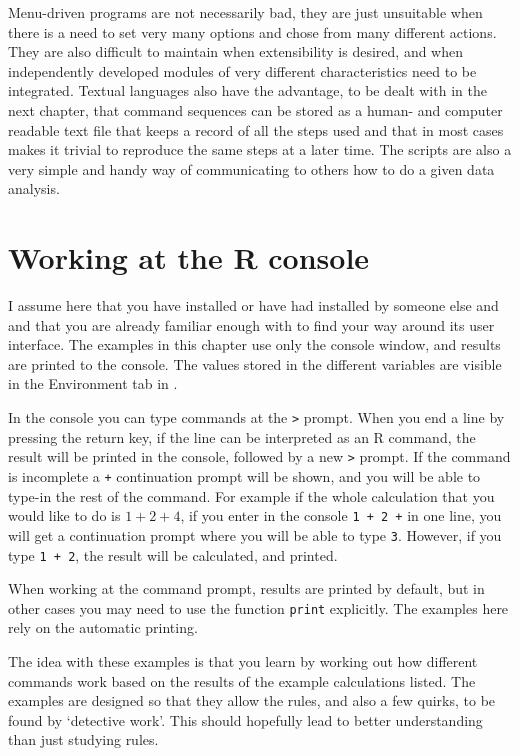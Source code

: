 \documentclass[paper=a4,headsepline,BCOR=12mm,twoside,open=right,%
titlepage,headings=small,fontsize=10pt,index=totoc,bibliography=totoc,%
captions=tableheading,captions=nooneline]{scrbook}\usepackage{knitr}
\begin{document}
Menu-driven programs are not necessarily bad, they are just unsuitable when there is a need to set very many options and chose from many different actions. They are also difficult to maintain when extensibility is desired, and when independently developed modules of very different characteristics need to be integrated. Textual languages also have the advantage, to be dealt with in the next chapter, that command sequences can be stored as a human- and computer readable text file that keeps a record of all the steps used and that in most cases makes it trivial to reproduce the same steps at a later time. The scripts are also a very simple and handy way of communicating to others how to do a given data analysis.

\section{Working at the R console}

I assume here that you have installed or have had installed by someone else \R and \RStudio and that you are already familiar enough with \RStudio to find your way around its user interface. The examples in this chapter use only the console window, and results are printed to the console. The values stored in the different variables are visible in the Environment tab in \RStudio.

In the console you can type commands at the \texttt{>} prompt.
When you end a line by pressing the return key, if the line can be interpreted as an R command, the result will be printed in the console, followed by a new \texttt{>} prompt.
If the command is incomplete a \texttt{+} continuation prompt will be shown, and you will be able to type-in the rest of the command. For example if the whole calculation that you would like to do is $1 + 2 + 4$, if you enter in the console \texttt{1 + 2 +} in one line, you will get a continuation prompt where you will be able to type \texttt{3}. However, if you type \texttt{1 + 2}, the result will be calculated, and printed.

When working at the command prompt, results are printed by default, but in other cases you may need to use the function \texttt{print} explicitly. The examples here rely on the automatic printing.

The idea with these examples is that you learn by working out how different commands work based on the results of the example calculations listed. The examples are designed so that they allow the rules, and also a few quirks, to be found by `detective work'. This should hopefully lead to better understanding than just studying rules.
\end{document}
